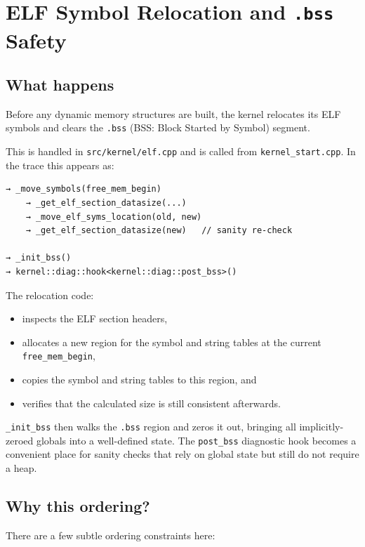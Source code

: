 \documentclass[a4paper,11pt]{article}
\begin{document}
\section{ELF Symbol Relocation and \texorpdfstring{\texttt{.bss}}{.bss} Safety}

\subsection{What happens}

Before any dynamic memory structures are built, the kernel relocates its
ELF symbols and clears the \texttt{.bss} (BSS: Block Started by Symbol)
segment.

This is handled in \texttt{src/kernel/elf.cpp} and is called from
\texttt{kernel\_start.cpp}. In the trace this appears as:

\begin{verbatim}
→ _move_symbols(free_mem_begin)
    → _get_elf_section_datasize(...)
    → _move_elf_syms_location(old, new)
    → _get_elf_section_datasize(new)   // sanity re-check

→ _init_bss()
→ kernel::diag::hook<kernel::diag::post_bss>()
\end{verbatim}

The relocation code:

\begin{itemize}
  \item inspects the ELF section headers,
  \item allocates a new region for the symbol and string tables at
        the current \texttt{free\_mem\_begin},
  \item copies the symbol and string tables to this region, and
  \item verifies that the calculated size is still consistent afterwards.
\end{itemize}

\texttt{\_init\_bss} then walks the \texttt{.bss} region and zeros it out,
bringing all implicitly-zeroed globals into a well-defined state. The
\texttt{post\_bss} diagnostic hook becomes a convenient place for sanity
checks that rely on global state but still do not require a heap.

\subsection{Why this ordering?}

There are a few subtle ordering constraints here:
\end{document}
